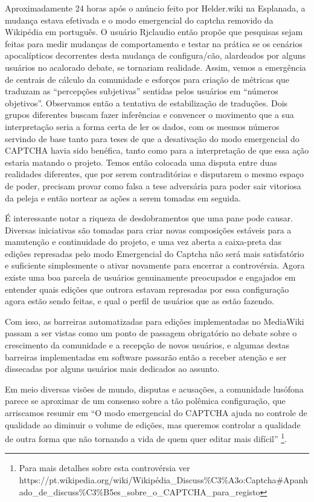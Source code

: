 Aproximadamente 24 horas após o anúncio feito por Helder.wiki na Esplanada, a mudança estava efetivada e o modo emergencial do captcha removido da Wikipédia em português. O usuário Rjclaudio então propõe que pesquisas sejam feitas para medir mudanças de comportamento e testar na prática se os cenários apocalípticos decorrentes desta mudança de configura/cão, alardeados por alguns usuários no acalorado debate, se tornariam realidade. Assim, vemos a emergência de centrais de cálculo da comunidade e esforços para criação de métricas que traduzam as “percepções subjetivas” sentidas pelos usuários em “números objetivos”. Observamos então a tentativa de estabilização de traduções. Dois grupos diferentes buscam fazer inferências e convencer o movimento que a sua interpretação seria a forma certa de ler os dados, com os mesmos números servindo de base tanto para teses de que a desativação do modo emergencial do CAPTCHA havia sido benéfica, tanto como para a interpretação de que essa ação estaria matando o projeto. Temos então colocada uma disputa entre duas realidades diferentes, que por serem contraditórias e disputarem o mesmo espaço de poder, precisam provar como falsa a tese adversária para poder sair vitoriosa da peleja e então nortear as ações a serem tomadas em seguida.

É interessante notar a riqueza de desdobramentos que uma pane pode causar. Diversas iniciativas são tomadas para criar novas composições estáveis para a manutenção e continuidade do projeto, e uma vez aberta a caixa-preta das edições represadas pelo modo Emergencial do Captcha não será mais satisfatório e suficiente simplesmente o ativar novamente para encerrar a controvérsia. Agora existe uma boa parcela de usuários genuinamente preocupados e engajados em entender quais edições que outrora estavam represadas por essa configuração agora estão sendo feitas, e qual o perfil de usuários que as estão fazendo. 

Com isso, as barreiras automatizadas para edições implementadas no MediaWiki passam a ser vistas como um ponto de passagem obrigatório no debate sobre o crescimento da comunidade e a recepção de novos usuários, e algumas destas barreiras implementadas em software passarão então a receber atenção e ser dissecadas por alguns usuários mais dedicados ao assunto.


Em meio diversas visões de mundo, disputas e acusações, a comunidade lusófona parece se aproximar de um consenso sobre a tão polêmica configuração, que arriscamos resumir em ``O modo emergencial do CAPTCHA ajuda no controle de qualidade ao diminuir o volume de edições, mas queremos controlar a qualidade de outra forma que não tornando a vida de quem quer editar mais difícil'' \footnote{Para mais detalhes sobre esta controvérsia ver https://pt.wikipedia.org/wiki/Wikipédia\_Discuss\%C3\%A3o:Captcha\#Apanhado\_de\_discuss\%C3\%B5es\_sobre\_o\_CAPTCHA\_para\_registo}. 

